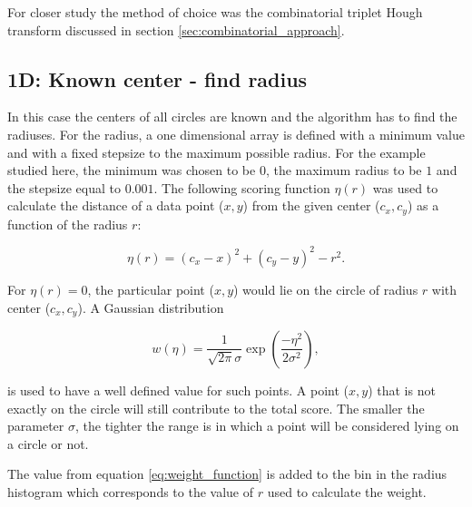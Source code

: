 \documentclass[11pt]{scrreprt}
\begin{document}
For closer study the 
method of choice was the combinatorial triplet Hough transform discussed in section \ref{sec:combinatorial_approach}.

\subsection{1D: Known center - find radius} %
\label{sub:1d_known_center_find_radius}

In this case the centers of all circles are known and the algorithm has to find the radiuses. For the radius, a one dimensional array is defined with a 
minimum value and with a fixed stepsize to the maximum possible radius. For the example studied here, the minimum was chosen to be $0$, 
the maximum radius to be $1$ and the stepsize equal to $0.001$. The following scoring function $\eta(r)$ was used to calculate the distance
of a data point ($x,y$) from the given center ($c_x, c_y$) as a function of the radius $r$:

\begin{equation}
\label{eq:score_function}
  \eta(r) = (c_x - x)^2 + (c_y - y)^2 - r ^ 2.
\end{equation}

For $\eta(r)=0$, the particular point ($x,y$) would lie on the circle of radius $r$ with center ($c_x, c_y$).
A Gaussian distribution 

\begin{equation}
\label{eq:weight_function}
  w(\eta) = \frac{1}{\sqrt{2\pi}\sigma}\exp\left( \frac{-\eta^2}{2\sigma^2}\right),
\end{equation}

is used to have a well defined value for such points. A point ($x,y$) that is not exactly on the circle will still contribute to the total score. The smaller the parameter $\sigma$, the tighter the range is
in which a point will be considered lying on a circle or not.

The value from equation \ref{eq:weight_function} is added to the bin in the radius histogram which corresponds to the value of $r$ used to
calculate the weight.
\end{document}
